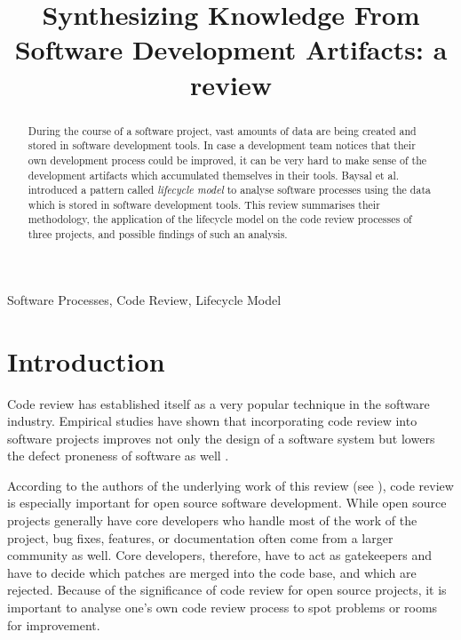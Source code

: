 \documentclass[conference]{IEEEtran}
\begin{document}
\title{Synthesizing Knowledge From Software Development Artifacts: a review}

\author{
}

\maketitle

\begin{abstract}
During the course of a software project, vast amounts of data are being created and stored in software development tools. In case a development team notices that their own development process could be improved, it can be very hard to make sense of the development artifacts which accumulated themselves in their tools. Baysal et al. introduced a pattern called \textit{lifecycle model} to analyse software processes using the data which is stored in software development tools. This review summarises their methodology, the application of the lifecycle model on the code review processes of three projects, and possible findings of such an analysis.
\end{abstract}

\begin{IEEEkeywords}
Software Processes, Code Review, Lifecycle Model
\end{IEEEkeywords}

\section{Introduction}

Code review has established itself as a very popular technique in the software industry. Empirical studies have shown that incorporating code review into software projects improves not only the design of a software system but lowers the defect proneness of software as well \cite{mcintosh2016empirical}\cite{morales2015code}.

According to the authors of the underlying work of this review (see \cite{baysal2015synthesizing}), code review is especially important for open source software development. While open source projects generally have core developers who handle most of the work of the project, bug fixes, features, or documentation often come from a larger community as well. Core developers, therefore, have to act as gatekeepers and have to decide which patches are merged into the code base, and which are rejected. Because of the significance of code review for open source projects, it is important to analyse one's own code review process to spot problems or rooms for improvement.
\end{document}
